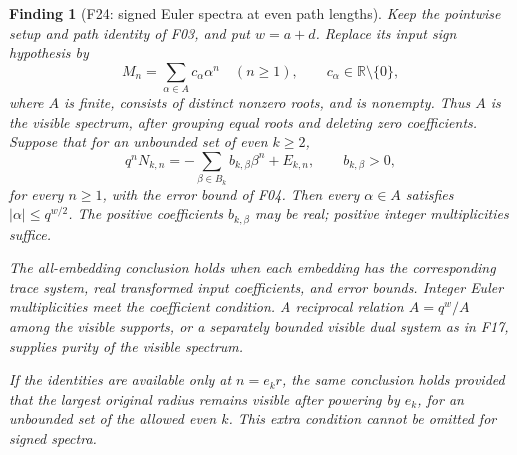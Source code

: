 \documentclass[11pt,a4paper]{article}
\newcommand{\fid}[1]{\textsf{#1}}\newcommand{\gate}[1]{\textsf{#1}}
\theoremstyle{named}\newtheorem{finding}{Finding}[section]
\theoremstyle{definition}\newtheorem{definition}[finding]{Definition}
\theoremstyle{remark}\newtheorem{remark}[finding]{Remark}
\begin{document}
\begin{finding}[\fid{F24}: signed Euler spectra at even path lengths]\label{f:signed}
Keep the pointwise setup and path identity of \fid{F03}, and put $w=a+d$.
Replace its input sign hypothesis by
\[
 M_n=\sum_{\alpha\in A}c_\alpha\alpha^n\quad(n\ge1),
 \qquad c_\alpha\in\mathbb R\setminus\{0\},
\]
where $A$ is finite, consists of distinct nonzero roots, and is nonempty.
Thus $A$ is the \emph{visible spectrum}, after grouping equal roots and deleting
zero coefficients. Suppose that for an unbounded set of \emph{even} $k\ge2$,
\[
 q^nN_{k,n}=-\sum_{\beta\in B_k}b_{k,\beta}\beta^n+E_{k,n},
 \qquad b_{k,\beta}>0,
\]
for every $n\ge1$, with the error bound of \fid{F04}. Then every
$\alpha\in A$ satisfies $|\alpha|\le q^{w/2}$. The positive coefficients
$b_{k,\beta}$ may be real; positive integer multiplicities suffice.

The all-embedding conclusion holds when each embedding has the corresponding
trace system, real transformed input coefficients, and error bounds. Integer
Euler multiplicities meet the coefficient condition. A reciprocal relation
$A=q^w/A$ among the visible supports, or a separately bounded visible dual
system as in \fid{F17}, supplies purity of the visible spectrum.

If the identities are available only at $n=e_kr$, the same conclusion holds
provided that the largest original radius remains visible after powering
by $e_k$, for an unbounded set of the allowed even $k$. This extra condition
cannot be omitted for signed spectra.
\end{finding}
\end{document}
